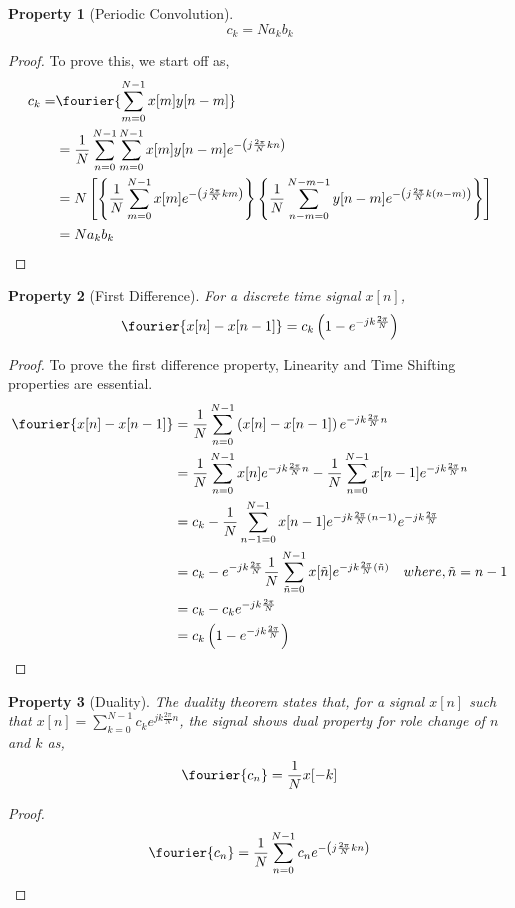 \documentclass{home_assignment}
\newtheorem{theorem}{Property}
\begin{document}
{\begin{theorem}[Periodic Convolution]
$$
c_k=Na_kb_k
$$
\end{theorem}
\begin{proof}
To prove this, we start off as,
$$
\begin{aligned}
c_k=&\fourier{\sum_{m=0}^{N-1}x[m]y[n-m]}\\
&=\frac{1}{N}\sum_{n=0}^{N-1} \sum_{m=0}^{N-1} x[m]y[n-m] e^{-\left(j \frac{2 \pi}{N} k n\right)}\\
&=N\left[\left\lbrace \frac{1}{N}\sum_{m=0}^{N-1} x[m]e^{-\left(j \frac{2 \pi}{N} k m\right)}\right\rbrace\left\lbrace\frac{1}{N}\sum_{n-m=0}^{N-m-1}y[n-m] e^{-\left(j \frac{2 \pi}{N} k (n-m)\right)}\right\rbrace\right]\\
&=Na_kb_k
\end{aligned}
$$
\end{proof}
\begin{theorem}[First Difference]
For a discrete time signal $x[n]$,
$$\fourier{x[n]-x[n-1]}=c_k\left(1-e^{-jk\frac{2\pi}{N}}\right)$$
\end{theorem}
\begin{proof}
To prove the first difference property, Linearity and Time Shifting properties are essential.
$$
\begin{aligned}
\fourier{x[n]-x[n-1]}&=\frac{1}{N}\sum_{n=0}^{N-1}\left(x[n]-x[n-1]\right)e^{-jk\frac{2\pi}{N}n}\\
&=\frac{1}{N}\sum_{n=0}^{N-1}x[n]e^{-jk\frac{2\pi}{N}n}-\frac{1}{N}\sum_{n=0}^{N-1}x[n-1]e^{-jk\frac{2\pi}{N}n}\\
&=c_k-\frac{1}{N}\sum_{n-1=0}^{N-1}x[n-1]e^{-jk\frac{2\pi}{N}(n-1)}e^{-jk\frac{2\pi}{N}}\\
&=c_k-e^{-jk\frac{2\pi}{N}}\frac{1}{N}\sum_{\tilde{n}=0}^{N-1}x[\tilde{n}]e^{-jk\frac{2\pi}{N}(\tilde{n})}\quad where, \tilde{n}=n-1\\
&=c_k-c_ke^{-jk\frac{2\pi}{N}}\\&=c_k\left(1-e^{-jk\frac{2\pi}{N}}\right)
\end{aligned}
$$
\end{proof}
\begin{theorem}[Duality]
The duality theorem states that, for a signal $x[n]$ such that $x[n]=\sum_{k=0}^{N-1}c_ke^{jk\frac{2\pi}{N}n}$, the signal shows dual property for role change of $n$ and $k$ as,
$$
\fourier{c_n}=\frac{1}{N}x[-k]
$$
\end{theorem}
\begin{proof}
$$
\begin{aligned}
\fourier{c_n}&=\frac{1}{N}\sum_{n=0}^{N-1} c_n e^{-\left(j \frac{2 \pi}{N} k n\right)}\\

\end{aligned}$$
\end{proof}}
\end{document}

